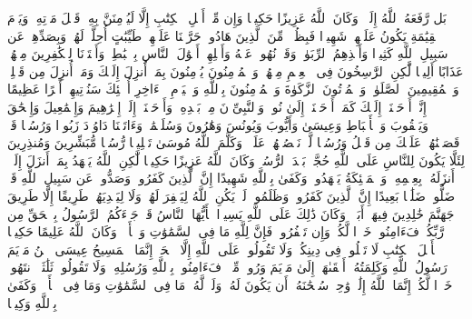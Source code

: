 \startbuffer[\q:4:158]
بَل رَّفَعَهُ ٱللَّهُ إِلَیۡهِۚ وَكَانَ ٱللَّهُ عَزِیزًا حَكِیمࣰا%
\stopbuffer%
\startbuffer[\q:4:159]
وَإِن مِّنۡ أَهۡلِ ٱلۡكِتَٰبِ إِلَّا لَیُؤۡمِنَنَّ بِهِۦ قَبۡلَ مَوۡتِهِۦۖ وَیَوۡمَ ٱلۡقِیَٰمَةِ یَكُونُ عَلَیۡهِمۡ شَهِیدࣰا%
\stopbuffer%
\startbuffer[\q:4:160]
فَبِظُلۡمࣲ مِّنَ ٱلَّذِینَ هَادُوا۟ حَرَّمۡنَا عَلَیۡهِمۡ طَیِّبَٰتٍ أُحِلَّتۡ لَهُمۡ وَبِصَدِّهِمۡ عَن سَبِیلِ ٱللَّهِ كَثِیرࣰا%
\stopbuffer%
\startbuffer[\q:4:161]
وَأَخۡذِهِمُ ٱلرِّبَوٰا۟ وَقَدۡ نُهُوا۟ عَنۡهُ وَأَكۡلِهِمۡ أَمۡوَٰلَ ٱلنَّاسِ بِٱلۡبَٰطِلِۚ وَأَعۡتَدۡنَا لِلۡكَٰفِرِینَ مِنۡهُمۡ عَذَابًا أَلِیمࣰا%
\stopbuffer%
\startbuffer[\q:4:162]
لَّٰكِنِ ٱلرَّٰسِخُونَ فِی ٱلۡعِلۡمِ مِنۡهُمۡ وَٱلۡمُؤۡمِنُونَ یُؤۡمِنُونَ بِمَاۤ أُنزِلَ إِلَیۡكَ وَمَاۤ أُنزِلَ مِن قَبۡلِكَۚ وَٱلۡمُقِیمِینَ ٱلصَّلَوٰةَۚ وَٱلۡمُؤۡتُونَ ٱلزَّكَوٰةَ وَٱلۡمُؤۡمِنُونَ بِٱللَّهِ وَٱلۡیَوۡمِ ٱلۡءَاخِرِ أُو۟لَٰۤئِكَ سَنُؤۡتِیهِمۡ أَجۡرًا عَظِیمًا%
\stopbuffer%
\startbuffer[\q:4:163]
۞ إِنَّاۤ أَوۡحَیۡنَاۤ إِلَیۡكَ كَمَاۤ أَوۡحَیۡنَاۤ إِلَىٰ نُوحࣲ وَٱلنَّبِیِّۦنَ مِنۢ بَعۡدِهِۦۚ وَأَوۡحَیۡنَاۤ إِلَىٰۤ إِبۡرَٰهِیمَ وَإِسۡمَٰعِیلَ وَإِسۡحَٰقَ وَیَعۡقُوبَ وَٱلۡأَسۡبَاطِ وَعِیسَىٰ وَأَیُّوبَ وَیُونُسَ وَهَٰرُونَ وَسُلَیۡمَٰنَۚ وَءَاتَیۡنَا دَاوُۥدَ زَبُورࣰا%
\stopbuffer%
\startbuffer[\q:4:164]
وَرُسُلࣰا قَدۡ قَصَصۡنَٰهُمۡ عَلَیۡكَ مِن قَبۡلُ وَرُسُلࣰا لَّمۡ نَقۡصُصۡهُمۡ عَلَیۡكَۚ وَكَلَّمَ ٱللَّهُ مُوسَىٰ تَكۡلِیمࣰا%
\stopbuffer%
\startbuffer[\q:4:165]
رُّسُلࣰا مُّبَشِّرِینَ وَمُنذِرِینَ لِئَلَّا یَكُونَ لِلنَّاسِ عَلَى ٱللَّهِ حُجَّةُۢ بَعۡدَ ٱلرُّسُلِۚ وَكَانَ ٱللَّهُ عَزِیزًا حَكِیمࣰا%
\stopbuffer%
\startbuffer[\q:4:166]
لَّٰكِنِ ٱللَّهُ یَشۡهَدُ بِمَاۤ أَنزَلَ إِلَیۡكَۖ أَنزَلَهُۥ بِعِلۡمِهِۦۖ وَٱلۡمَلَٰۤئِكَةُ یَشۡهَدُونَۚ وَكَفَىٰ بِٱللَّهِ شَهِیدًا%
\stopbuffer%
\startbuffer[\q:4:167]
إِنَّ ٱلَّذِینَ كَفَرُوا۟ وَصَدُّوا۟ عَن سَبِیلِ ٱللَّهِ قَدۡ ضَلُّوا۟ ضَلَٰلَۢا بَعِیدًا%
\stopbuffer%
\startbuffer[\q:4:168]
إِنَّ ٱلَّذِینَ كَفَرُوا۟ وَظَلَمُوا۟ لَمۡ یَكُنِ ٱللَّهُ لِیَغۡفِرَ لَهُمۡ وَلَا لِیَهۡدِیَهُمۡ طَرِیقًا%
\stopbuffer%
\startbuffer[\q:4:169]
إِلَّا طَرِیقَ جَهَنَّمَ خَٰلِدِینَ فِیهَاۤ أَبَدࣰاۚ وَكَانَ ذَٰلِكَ عَلَى ٱللَّهِ یَسِیرࣰا%
\stopbuffer%
\startbuffer[\q:4:170]
یَٰۤأَیُّهَا ٱلنَّاسُ قَدۡ جَاۤءَكُمُ ٱلرَّسُولُ بِٱلۡحَقِّ مِن رَّبِّكُمۡ فَءَامِنُوا۟ خَیۡرࣰا لَّكُمۡۚ وَإِن تَكۡفُرُوا۟ فَإِنَّ لِلَّهِ مَا فِی ٱلسَّمَٰوَٰتِ وَٱلۡأَرۡضِۚ وَكَانَ ٱللَّهُ عَلِیمًا حَكِیمࣰا%
\stopbuffer%
\startbuffer[\q:4:171]
یَٰۤأَهۡلَ ٱلۡكِتَٰبِ لَا تَغۡلُوا۟ فِی دِینِكُمۡ وَلَا تَقُولُوا۟ عَلَى ٱللَّهِ إِلَّا ٱلۡحَقَّۚ إِنَّمَا ٱلۡمَسِیحُ عِیسَى ٱبۡنُ مَرۡیَمَ رَسُولُ ٱللَّهِ وَكَلِمَتُهُۥۤ أَلۡقَىٰهَاۤ إِلَىٰ مَرۡیَمَ وَرُوحࣱ مِّنۡهُۖ فَءَامِنُوا۟ بِٱللَّهِ وَرُسُلِهِۦۖ وَلَا تَقُولُوا۟ ثَلَٰثَةٌۚ ٱنتَهُوا۟ خَیۡرࣰا لَّكُمۡۚ إِنَّمَا ٱللَّهُ إِلَٰهࣱ وَٰحِدࣱۖ سُبۡحَٰنَهُۥۤ أَن یَكُونَ لَهُۥ وَلَدࣱۘ لَّهُۥ مَا فِی ٱلسَّمَٰوَٰتِ وَمَا فِی ٱلۡأَرۡضِۗ وَكَفَىٰ بِٱللَّهِ وَكِیلࣰا%
